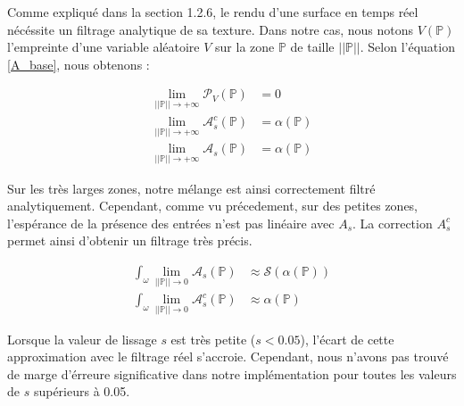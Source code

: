 \documentclass[9pt, twocolumn]{article} %
\begin{document}
Comme expliqué dans la section 1.2.6, le rendu d'une surface en temps réel
nécéssite un filtrage analytique de sa texture. Dans notre cas, nous notons
$V(\mathbb{P})$ l'empreinte d'une variable aléatoire $V$ sur la zone
$\mathbb{P}$ de taille $||\mathbb{P}||$. Selon l'équation \ref{A_base}, nous
obtenons :


\begin{equation}\label{A_filtrage_limites}
  \begin{split}
    \lim_{||\mathbb{P}|| \rightarrow +\infty} \mathcal{P}_{V}(\mathbb{P}) &= 0
    \\
    \lim_{||\mathbb{P}|| \rightarrow +\infty} \mathcal{A}_s^c(\mathbb{P}) &= \alpha(\mathbb{P})
    \\
    \lim_{||\mathbb{P}|| \rightarrow +\infty} \mathcal{A}_s(\mathbb{P}) &= \alpha(\mathbb{P})
  \end{split}
\end{equation}

Sur les très larges zones, notre mélange est ainsi correctement filtré
analytiquement. Cependant, comme vu précedement, sur des petites zones,
l'espérance de la présence des entrées n'est pas linéaire avec $A_s$. La
correction $A_s^c$ permet ainsi d'obtenir un filtrage très précis.

\begin{equation}\label{A_filtrage_limites2}
  \begin{split}
    \int_{\omega} \lim_{||\mathbb{P}|| \rightarrow 0} \mathcal{A}_s(\mathbb{P}) &\approx \mathcal{S}(\alpha(\mathbb{P}))
    \\
    \int_{\omega} \lim_{||\mathbb{P}|| \rightarrow 0} \mathcal{A}_s^c(\mathbb{P}) &\approx \alpha(\mathbb{P})
  \end{split}
\end{equation}

Lorsque la valeur de lissage $s$ est très petite ($s < 0.05$), l'écart de cette
approximation avec le filtrage réel s'accroie. Cependant, nous n'avons pas
trouvé de marge d'érreure significative dans notre implémentation pour toutes
les valeurs de $s$ supérieurs à 0.05.
\end{document}
